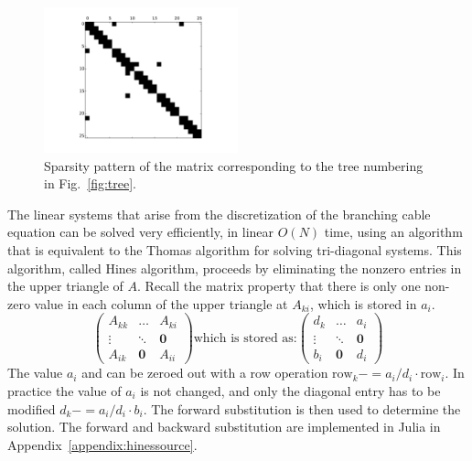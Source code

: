 \documentclass[11pt,a4paper]{article}
\newcommand{\fig}[1]{Fig.~\ref{#1}}
\newcommand{\ap}[1]{Appendix~\ref{#1}}
\begin{document}
\begin{figure}[htp!]
\centering
\includegraphics[width=0.5\textwidth]{./images/sparsity.pdf}
\caption{Sparsity pattern of the matrix corresponding to the tree numbering in \fig{fig:tree}.}
\label{fig:sparsity}
\end{figure}


The linear systems that arise from the discretization of the branching cable equation can be solved very efficiently, in linear $O(N)$ time, using an algorithm that is equivalent to the Thomas algorithm for solving tri-diagonal systems. This algorithm, called Hines algorithm, proceeds by eliminating the nonzero entries in the upper triangle of $A$. Recall the matrix property that there is only one non-zero value in each column of the upper triangle
 at $A_{ki}$, which is stored in $a_i$.
\begin{equation}
\left(
        \begin{array}{ccc}
            A_{kk} & \dots      & A_{ki} \\
        \vdots     & \ddots     & \mathbf{0} \\
            A_{ik} & \mathbf{0} & A_{ii}
        \end{array}
\right)
\text{which is stored as:}
\left(
        \begin{array}{ccc}
            d_k & \dots      & a_i \\
        \vdots  & \ddots     & \mathbf{0} \\
            b_i & \mathbf{0} & d_i
        \end{array}
\right)
\end{equation}
The value $a_i$ and can be zeroed out with a row operation $\text{row}_k -= a_i/d_i\cdot\text{row}_i$. In practice the value of $a_i$ is not changed, and only the diagonal entry has to be modified $d_k -= a_i/d_i\cdot b_i$. The forward substitution is then used to determine the solution. The forward and backward substitution are implemented in Julia in \ap{appendix:hinessource}.
\end{document}
